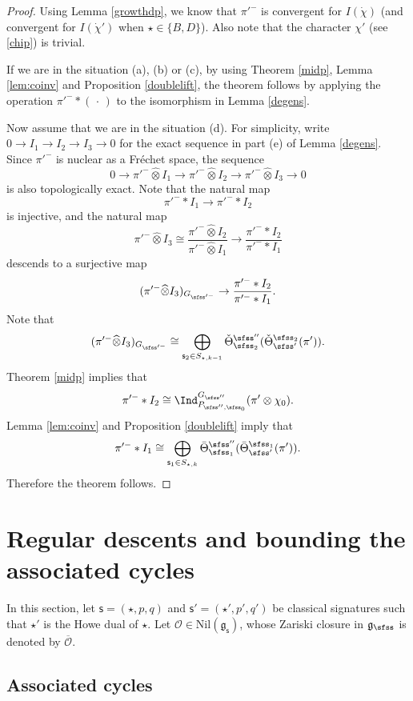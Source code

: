 \documentclass[12pt,a4paper]{amsart}
\newcommand{\CO}{{\mathcal {O}}}
\newcommand{\oS}{\operatorname{S}}
\newcommand{\g}{\mathfrak g}
\newcommand{\p}{\mathfrak p}
\numberwithin{equation}{section}
\theoremstyle{remark}
\def\Thetab{\bar{\Theta}}
\def\totimes{\widehat{\otimes}}
\begin{document}
\begin{proof}
Using Lemma \ref{growthdp}, we know that $\pi'^-$ is convergent for $I(\dot \chi)$ (and convergent for $I(\dot \chi')$ when $\star\in \{B,D\}$). Also note that the character $\chi'$ (see \eqref{chip}) is trivial.

If we are in the situation (a), (b) or (c), by using Theorem \ref{midp}, Lemma \ref{lem:coinv} and Proposition \ref{doublelift}, the theorem follows by applying the operation $\pi'^-*(\,\cdot\,)$ to the isomorphism in Lemma \ref{degens}.

Now assume that we are in the situation (d).
For simplicity, write $0\rightarrow I_1\rightarrow I_2\rightarrow I_3\rightarrow
0$ for the exact sequence in part (e) of Lemma \ref{degens}. Since $\pi'^-$ is nuclear as a Fr\'echet space, the sequence
\[
0\rightarrow \pi'^-\totimes I_1\rightarrow \pi'^-\totimes I_2\rightarrow \pi'^-\totimes I_3\rightarrow
0
\]
is also topologically exact.
Note that the natural map
\[
\pi'^- * I_1\rightarrow \pi'^- * I_2
\]
is injective, and the natural map
\[
  \pi'^-\totimes I_3\cong \frac{\pi'^-\totimes I_2}{\pi'^- \totimes I_1}\longrightarrow\frac{ \pi'^-*I_2}{\pi'^-*I_1}
  \]
descends to a surjective map
\[
  (\pi'^-\totimes  I_3)_{G_{\sfss'^-}}\rightarrow \frac{ \pi'^-*I_2}{\pi'^-*I_1}.
\]
Note that
\[
   (\pi'^-\totimes  I_3)_{G_{\sfss'^-}}\cong \bigoplus_{\mathsf s_2\in S_{\star, k-1}} \check \Theta^{\sfss''}_{\sfss_2}(\check \Theta^{\sfss_2}_{\sfss'}(\pi')).
\]
Theorem \ref{midp} implies that
\[
\pi'^-*I_2\cong \Ind_{P_{\sfss'',\sfss_0}}^{G_{\sfss''}} (\pi'\otimes \chi_0).
\]
Lemma \ref{lem:coinv} and Proposition \ref{doublelift} imply that
\[
\pi'^-*I_1\cong  \bigoplus_{\mathsf s_1\in S_{\star, k} } \Thetab^{\sfss''}_{\sfss_1}(\Thetab^{\sfss_1}_{\sfss'}(\pi')).
\]
Therefore the theorem follows.
\end{proof}

\section{Regular descents and bounding the associated  cycles}\label{sec:AC}

In this section, let $\mathsf s=(\star, p,q)$ and $ \mathsf s'=(\star', p',q')$ be classical signatures such that $\star'$ is the Howe dual of $\star$.
Let $\CO\in \mathrm{Nil}(\g_\mathsf s)$, whose Zariski closure in $\g_\sfss$ is denoted by $\overline \CO$.


\subsection{Associated cycles}%
\end{document}
